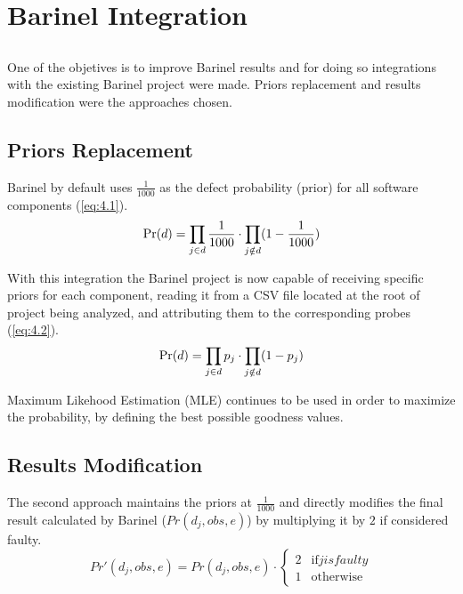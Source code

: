 \chapter{Barinel Integration}\label{chap:barinel-integration}

\section*{}

One of the objetives is to improve Barinel results and for doing so integrations with the existing Barinel project were made.
Priors replacement and results modification were the approaches chosen.

\section{Priors Replacement}

Barinel by default uses $\frac{1}{1000}$ as the defect probability (prior) for all software components (\ref{eq:4.1}).
%
\begin{equation} \label{eq:4.1}
  \mbox{Pr}(d) = \prod_{j \in d} \frac{1}{1000} \cdot \prod_{j \notin d} (1 - \frac{1}{1000})
\end{equation}

With this integration the Barinel project is now capable of receiving specific priors for each component, reading it from a CSV file located at the root of project being analyzed, and attributing them to the corresponding probes (\ref{eq:4.2}).
%
\begin{equation} \label{eq:4.2}
  \mbox{Pr}(d) = \prod_{j \in d} p_j \cdot \prod_{j \notin d} (1 - p_j)
\end{equation}


Maximum Likehood Estimation (MLE) continues to be used in order to maximize the probability, by defining the best possible goodness values.

\section{Results Modification}

The second approach maintains the priors at $\frac{1}{1000}$ and directly modifies the final result calculated by Barinel ($Pr(d_j, obs, e)$) by multiplying it by $2$ if considered faulty.
%
\begin{equation} \label{eq:4.2}
  Pr'(d_j, obs, e) = Pr(d_j, obs, e) \cdot 
  \begin{cases}
    2   & \textrm{if} j is faulty \\
	1  	& \textrm{otherwise}
  \end{cases}
\end{equation}

